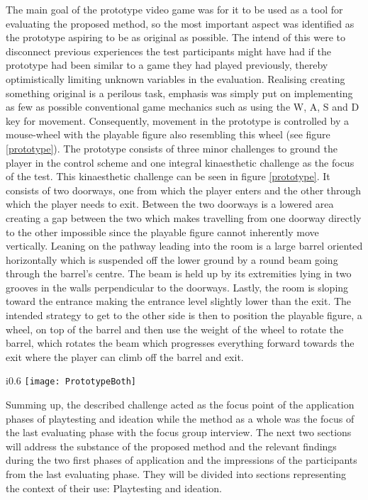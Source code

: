 The main goal of the prototype video game was for it to be used as a tool for evaluating the proposed method, so the most important aspect was identified as the prototype aspiring to be as original as possible. The intend of this were to disconnect previous experiences the test participants might have had if the prototype had been similar to a game they had played previously, thereby optimistically limiting unknown variables in the evaluation. Realising creating something original is a perilous task, emphasis was simply put on implementing as few as possible conventional game mechanics such as using the W, A, S and D key for movement. Consequently, movement in the prototype is controlled by a mouse-wheel with the playable figure also resembling this wheel (see figure \ref{prototype}). The prototype consists of three minor challenges to ground the player in the control scheme and one integral kinaesthetic challenge as the focus of the test. This kinaesthetic challenge can be seen in figure \ref{prototype}. It consists of two doorways, one from which the player enters and the other through which the player needs to exit. Between the two doorways is a lowered area creating a gap between the two which makes travelling from one doorway directly to the other impossible since the playable figure cannot inherently move vertically. Leaning on the pathway leading into the room is a large barrel oriented horizontally which is suspended off the lower ground by a round beam going through the barrel's centre. The beam is held up by its extremities lying in two grooves in the walls perpendicular to the doorways. Lastly, the room is sloping toward the entrance making the entrance level slightly lower than the exit. The intended strategy to get to the other side is then to position the playable figure, a wheel, on top of the barrel and then use the weight of the wheel to rotate the barrel, which rotates the beam which progresses everything forward towards the exit where the player can climb off the barrel and exit.

\begin{wrapfigure}{i}{0.6\textwidth}
  \texttt{[image: PrototypeBoth]}
  \caption{(a) In-game photo of the prototype as it is presented to a new player (b) The kinaesthetic challenge in focus}
  \label{prototype}
\end{wrapfigure}

Summing up, the described challenge acted as the focus point of the application phases of playtesting and ideation while the method as a whole was the focus of the last evaluating phase with the focus group interview. The next two sections will address the substance of the proposed method and the relevant findings during the two first phases of application and the impressions of the participants from the last evaluating phase. They will be divided into sections representing the context of their use: Playtesting and ideation.

